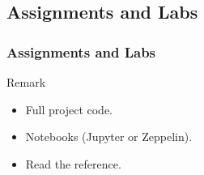 \begin{frame}
\begin{tikzpicture}[node distance=2cm,
every node/.style={fill=white, font=\sffamily}, align=center,scale=0.6, every node/.style={transform shape}]
\end{tikzpicture}

\end{frame}


\subsection{Assignments and Labs}
\begin{frame}
\frametitle{Assignments and Labs}
\begin{block}{Remark}
\begin{itemize}
	\item<1-> Full project code.
	\item<2-> Notebooks (Jupyter or Zeppelin).
	\item<3-> Read the reference.
\end{itemize}
\end{block}
\end{frame}


